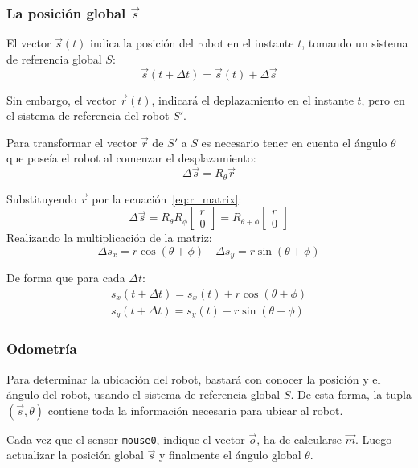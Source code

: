 \documentclass[10pt,a4paper,hidelinks,twocolumn,nobalancelastpage]{article}
\begin{document}
\subsubsection{La posición global $\vec{s}$}
El vector $\vec{s}(t)$ indica la posición del robot en el instante $t$, tomando 
un sistema de referencia global $S$:
$$
	\vec{s}(t + \Delta t) =
		\vec{s}(t) + \Delta \vec{s}
$$

Sin embargo, el vector $\vec{r}(t)$, indicará el deplazamiento en el instante 
$t$, pero en el sistema de referencia del robot $S'$.

Para transformar el vector $\vec{r}$ de $S'$ a $S$ es necesario tener en cuenta 
el ángulo $\theta$ que poseía el robot al comenzar el desplazamiento:
$$
	\Delta\vec{s} = R_{\theta} \vec{r}
$$

Substituyendo $\vec{r}$ por la ecuación~\ref{eq:r_matrix}:
$$
	\Delta\vec{s} = R_{\theta} R_{\phi}
			\begin{bmatrix}
				r \\
				0
			\end{bmatrix}
		= R_{\theta + \phi}
			\begin{bmatrix}
				r \\
				0
			\end{bmatrix}
$$
Realizando la multiplicación de la matriz:
$$
	\Delta s_x = r\cos(\theta + \phi) \quad
	\Delta s_y = r\sin(\theta + \phi)
$$

De forma que para cada $\Delta t$:
\begin{equation}
\begin{split}
	s_x(t + \Delta t) = s_x(t) + r\cos(\theta + \phi) \\
	s_y(t + \Delta t) = s_y(t) + r\sin(\theta + \phi)
\end{split}
\label{eq:s}
\end{equation}

\subsubsection{Odometría}
Para determinar la ubicación del robot, bastará con conocer la posición y el 
ángulo del robot, usando el sistema de referencia global $S$. De esta forma, la 
tupla $(\vec{s}, \theta)$ contiene toda la información necesaria para ubicar al 
robot.

Cada vez que el sensor \texttt{mouse0}, indique el vector $\vec{o}$, ha de 
calcularse $\vec{m}$. Luego actualizar la posición global $\vec{s}$ y finalmente 
el ángulo global $\theta$.
\end{document}
